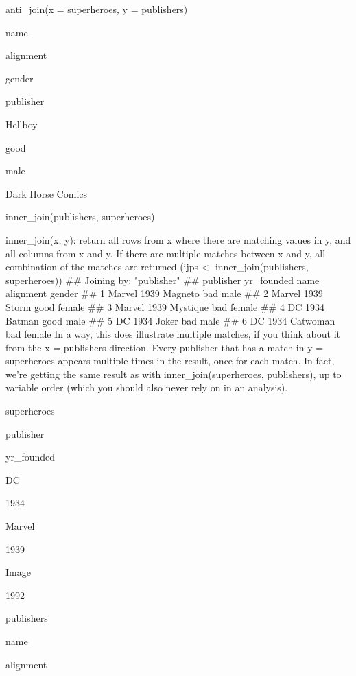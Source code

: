 anti_join(x = superheroes, y = publishers)
 


name
 
alignment
 
gender
 
publisher
 



Hellboy
 
good
 
male
 
Dark Horse Comics
 



inner_join(publishers, superheroes)
 

inner_join(x, y): return all rows from x where there are matching values in y, and all columns from x and y. If there are multiple matches between x and y, all combination of the matches are returned
 (ijps <- inner_join(publishers, superheroes)) ## Joining by: "publisher" ##   publisher yr_founded     name alignment gender
## 1    Marvel       1939  Magneto       bad   male
## 2    Marvel       1939    Storm      good female
## 3    Marvel       1939 Mystique       bad female
## 4        DC       1934   Batman      good   male
## 5        DC       1934    Joker       bad   male
## 6        DC       1934 Catwoman       bad female 
In a way, this does illustrate multiple matches, if you think about it from the x = publishers direction. Every publisher that has a match in y = superheroes appears multiple times in the result, once for each match. In fact, we’re getting the same result as with inner_join(superheroes, publishers), up to variable order (which you should also never rely on in an analysis).
 



superheroes
 


publisher
 
yr_founded
 



DC
 
1934
 


Marvel
 
1939
 


Image
 
1992
 


publishers
 


name
 
alignment
 
